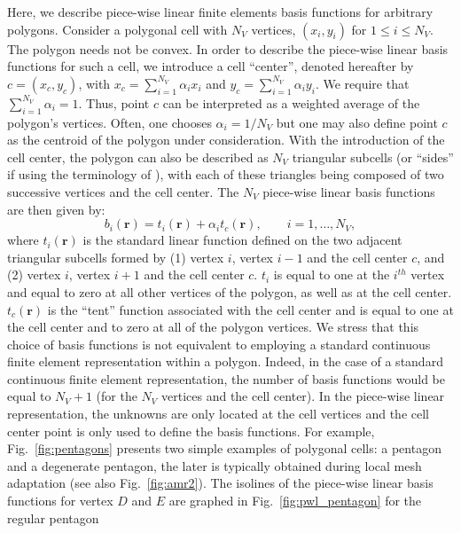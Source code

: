 \documentclass[preprint,10pt]{elsarticle}
\newcommand{\fig}[1]{Fig.~\ref{#1}}                      %
\newcommand\br{\mathbf{r}}
\begin{document}
Here, we describe piece-wise linear finite elements basis functions for
arbitrary polygons.
Consider a polygonal cell with $N_V$ vertices, $(x_i,y_i)$ for $1\le i \le N_V$. 
The polygon needs not be convex. In order to describe the piece-wise linear basis functions
for such a cell, we introduce a cell ``center'', denoted hereafter 
by $c=(x_c,y_c)$, with $x_c =\sum_{i=1}^{N_V} \alpha_{i} x_i$
and  $y_c = \sum_{i=1}^{N_V} \alpha_{i} y_i$. We require that
$\sum_{i=1}^{N_V} \alpha_{i} = 1$. Thus, point $c$ can be interpreted as 
a weighted average of the polygon's vertices. Often, one chooses 
$\alpha_i = 1 / N_V$ but one may also define point $c$ as the centroid of the
polygon under consideration.
With the introduction of the cell center, the polygon can also be described as
$N_V$ triangular subcells (or ``sides'' if using the terminology of \cite{BaileyAdams2008}), 
with each of these triangles being composed of two
successive vertices and the cell center.
The $N_V$ piece-wise linear basis functions are then given by:
%
\begin{equation}
  b_i(\br) = t_i(\br) + \alpha_{i} t_c(\br) , \qquad i=1,\ldots,N_V ,
\end{equation}
%
where $t_i(\br)$ is the standard linear function defined on the two adjacent
triangular subcells formed by (1) vertex $i$, vertex $i-1$ and the cell center $c$,
and (2) vertex $i$, vertex $i+1$ and the cell center $c$.
$t_i$ is equal to one at the $i^{th}$ vertex and equal to zero at all other vertices of the polygon,
as well as at the cell center.
$t_c(\br)$ is the ``tent'' function associated with the cell center and is equal to one 
at the cell center and to zero at all of the polygon vertices.
%
We stress that this choice of basis functions is not equivalent to employing a standard 
continuous finite element representation within a polygon. 
Indeed, in the case of a standard continuous finite 
element representation, the number of basis functions would be equal to $N_V+1$ 
(for the $N_V$ vertices and the cell center). In the
piece-wise linear representation, the unknowns are only located at the cell 
vertices and the cell center point is only used to define the basis functions.
For example, \fig{fig:pentagons} presents two simple examples of polygonal cells: a 
pentagon and a degenerate pentagon, the later is typically obtained
during local mesh adaptation (see also \fig{fig:amr2}).
The isolines of the piece-wise linear basis functions for vertex $D$ and
$E$ are graphed in \fig{fig:pwl_pentagon} for the regular pentagon
\end{document}
